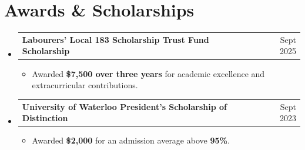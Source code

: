 \documentclass[letterpaper,11pt]{article}
\makeatletter
\newcommand{\resumeItem}[1]{
  \item\small{#1 \vspace{-2pt}}
}
\newcommand{\resumeProjectHeading}[2]{
  \item
  \begin{tabular*}{0.97\textwidth}{l@{\extracolsep{\fill}}r}
    \small#1 & #2
  \end{tabular*}\vspace{-7pt}
}
\newcommand{\resumeSubHeadingListStart}{
  \begin{itemize}[leftmargin=0.15in, label={}]
}
\newcommand{\resumeSubHeadingListEnd}{\end{itemize}}
\newcommand{\resumeItemListStart}{\begin{itemize}}
\newcommand{\resumeItemListEnd}{\end{itemize}\vspace{-5pt}}
\makeatother
\begin{document}
\section{Awards \& Scholarships}
\resumeSubHeadingListStart
  \resumeProjectHeading
    {\textbf{Labourers' Local 183 Scholarship Trust Fund Scholarship}}{Sept 2025}
  \resumeItemListStart
    \resumeItem{Awarded \textbf{\$7,500 over three years} for academic excellence and extracurricular contributions.}
  \resumeItemListEnd

  \resumeProjectHeading
    {\textbf{University of Waterloo President's Scholarship of Distinction}}{Sept 2023}
  \resumeItemListStart
    \resumeItem{Awarded \textbf{\$2,000} for an admission average above \textbf{95\%}.}
  \resumeItemListEnd
\resumeSubHeadingListEnd
\end{document}
